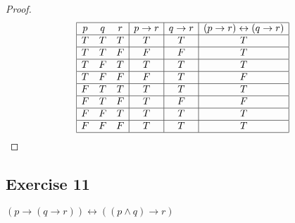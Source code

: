 \documentclass[14pt]{extarticle}
\newcommand{\bic}{\leftrightarrow}
\begin{document}
\begin{proof}
    $$
        \begin{array}{|ccc|c|c|c|}
            \hline
            p & q & r & p \to r & q \to r & (p \to r) \bic (q \to r) \\
            \hline
            T & T & T & T       & T       & T                        \\
            \hline
            T & T & F & F       & F       & T                        \\
            \hline
            T & F & T & T       & T       & T                        \\
            \hline
            T & F & F & F       & T       & F                        \\
            \hline
            F & T & T & T       & T       & T                        \\
            \hline
            F & T & F & T       & F       & F                        \\
            \hline
            F & F & T & T       & T       & T                        \\
            \hline
            F & F & F & T       & T       & T                        \\
            \hline
        \end{array}
    $$
\end{proof}

\subsection{Exercise 11}
$(p \to (q \to r)) \bic ((p \wedge q) \to r)$
\end{document}
